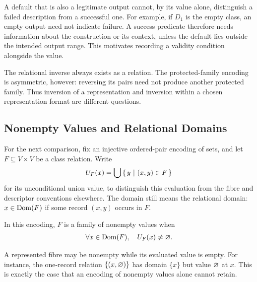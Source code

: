 A default that is also a legitimate output cannot, by its value alone,
distinguish a failed description from a successful one. For example, if
$D_1$ is the empty class, an empty output need not indicate failure. A
success predicate therefore needs information about the construction or its
context, unless the default lies outside the intended output range.
This motivates recording a validity condition alongside the value.

The relational inverse always exists as a relation. The protected-family
encoding is asymmetric, however: reversing its pairs need not produce
another protected family. Thus inversion of a representation and inversion
within a chosen representation format are different questions.

\subsection{Nonempty Values and Relational Domains}
For the next comparison, fix an injective ordered-pair encoding of sets,
and let $F\subseteq V\times V$ be a class relation. Write
\[
U_F(x)=\bigcup\left\{\,y\ \middle|\ (x,y)\in F\,\right\}
\]
for its unconditional union value, to distinguish this evaluation from the
fibre and descriptor conventions elsewhere. The domain still means the
relational domain: $x\in\mathrm{Dom}(F)$ if some record $(x,y)$ occurs in $F$.

\begin{definition}
In this encoding, $F$ is a family of nonempty values when
\[
\forall x\in\mathrm{Dom}(F),\quad U_F(x)\neq\varnothing.
\]
\end{definition}
A represented fibre may be nonempty while its evaluated value is empty.
For instance, the one-record relation $\{(x,\varnothing)\}$ has domain
$\{x\}$ but value $\varnothing$ at $x$. This is exactly the case that an
encoding of nonempty values alone cannot retain.

